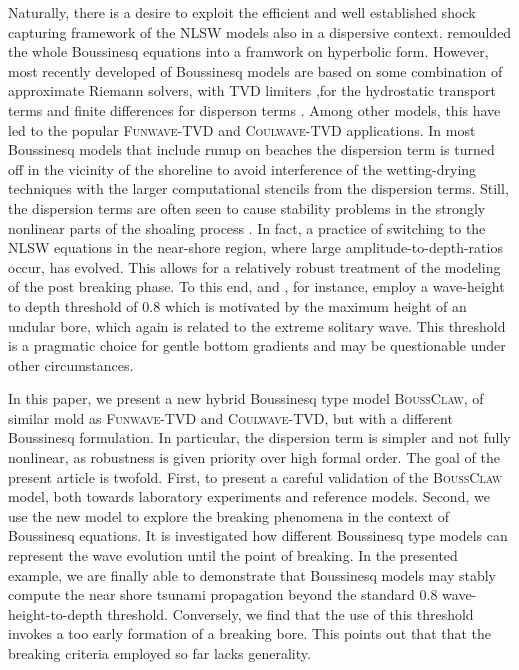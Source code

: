 \documentclass[review]{elsarticle}
\newcommand{\BoussClaw}{\textsc{BoussClaw} }
\newcommand{\BoussClawt}{\textsc{BoussClaw}}
\begin{document}
Naturally, there is a desire to exploit the efficient and well established shock capturing framework of the NLSW models also in a dispersive context.
\cite{Antuono:2009} remoulded the whole Boussinesq equations into a framwork on hyperbolic form.
However, most recently developed of  Boussinesq models are based on some combination of approximate Riemann solvers, with TVD limiters ,for the hydrostatic transport terms and finite differences
for disperson terms \citep{Erduran2005,Kim2009,Shiach:2009,Roeber:2010,Dutykh:2011,shi2012high}. Among other models, this have led to the popular
\textsc{Funwave-TVD} and \textsc{Coulwave-TVD} applications. 
In most Boussinesq models that include runup on beaches the dispersion term
is turned off in the vicinity of the shoreline to avoid interference of
the wetting-drying techniques with the
larger computational stencils from the dispersion terms. Still,
the dispersion terms are often seen to cause stability problems in
the strongly nonlinear parts of the shoaling process \citep{Lovholt:2013a}.
In fact, a practice of  
switching to the NLSW equations in the near-shore region, where large amplitude-to-depth-ratios occur, has evolved.
This allows for a relatively robust treatment of the modeling of the post breaking phase. To this end, \cite{tonelli2009hybrid} and \cite{shi2012high}, for instance, employ a wave-height to depth threshold of $0.8$  which is motivated by the maximum 
height of an undular bore, which again is related to the extreme solitary wave.
This threshold is a pragmatic choice for gentle   bottom gradients and
may be questionable under other circumstances.  

In this paper, we present a new hybrid Boussinesq type model \BoussClawt, 
of similar mold as \textsc{Funwave-TVD} and \textsc{Coulwave-TVD}, but with a different Boussinesq formulation. In particular, the dispersion term is simpler
and not fully nonlinear, as robustness is given priority over high formal order. The goal of the present article is twofold.
First, to present a careful validation of the \BoussClaw model, both towards  
laboratory experiments and reference models. Second, we use the new model
to explore the breaking phenomena in the context of Boussinesq equations.
It is investigated how different Boussinesq type models 
can represent the wave evolution until the point of breaking. In the presented example,
we are finally able to demonstrate that Boussinesq models may stably
compute the near shore tsunami propagation beyond the standard $0.8$ wave-height-to-depth threshold.
Conversely, we find that the use of this threshold  
invokes a too early formation of a breaking bore. This points out that  
that the breaking criteria employed so far lacks generality.
\end{document}
